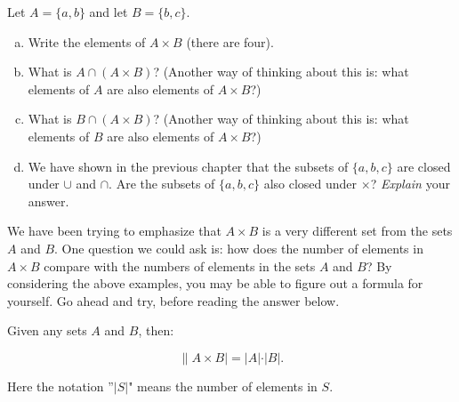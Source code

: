 \begin{exercise}{}
Let $A = \{a,b\}$ and let $B = \{b,c\}$.
\begin{enumerate}[(a)]
\item
Write the elements of $A \times B$ (there are four).
\item 
What is $A \cap (A \times B)$? (Another way of thinking about this is: what elements of $A$ are also elements of $A \times B$?)
\item 
What is $B \cap (A \times B)$? (Another way of thinking about this is: what elements of $B$ are also elements of $A \times B$?)
\item
We have shown in the previous chapter that the subsets of $\{a,b,c\}$ are closed under $\cup$ and $\cap$. Are the subsets of $\{a,b,c\}$ also closed under $\times$? \emph{Explain} your answer.
\end{enumerate}
\end{exercise}

We have been trying to emphasize that $A \times B$ is a very different set from the sets $A$ and $B$.  One question we could ask is: how does the number of elements in $A \times B$ compare with the numbers of elements in the sets $A$ and $B$?  By considering the above examples, you may be able to figure out a formula for yourself.  Go ahead and try, before reading the answer below.

\begin{prop}{}
Given any sets $A$ and $B$, then:

\[  \|A \times B|= |A| \cdot |B|. \]

Here the notation ''$|S|$" means the number of elements in $S$.
\end{prop}


